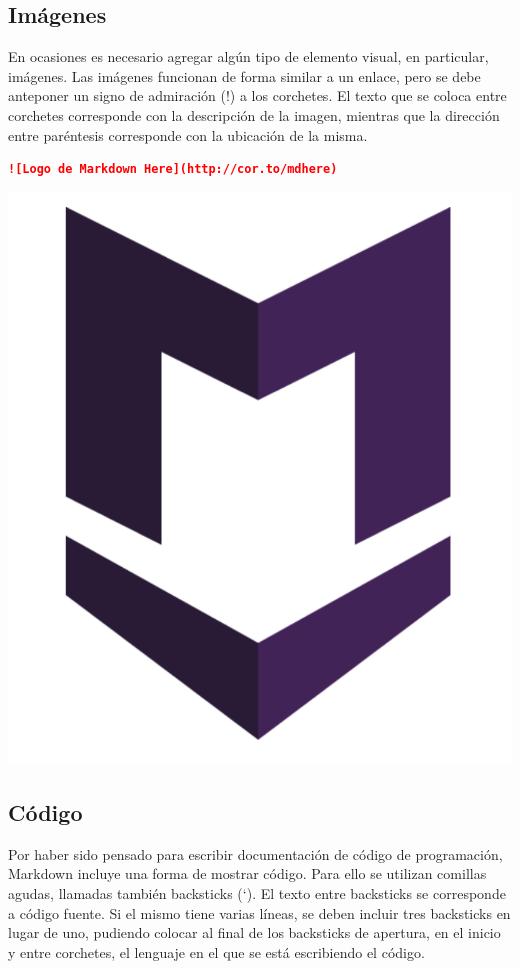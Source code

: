 \subsection*{Imágenes}

En ocasiones es necesario agregar algún tipo de elemento visual, en particular,
imágenes. Las imágenes funcionan de forma similar a un enlace, pero se debe
anteponer un signo de admiración (!) a los corchetes. El texto que se coloca
entre corchetes corresponde con la descripción de la imagen, mientras que la
dirección entre paréntesis corresponde con la ubicación de la misma.

\begin{lstlisting}[language=Markdown]
![Logo de Markdown Here](http://cor.to/mdhere)
\end{lstlisting}

\includegraphics[scale=0.4]{anexos/1_lenguajes_marcado/1_markdown/imagenes/md_imagen.png}

\subsection*{Código}

Por haber sido pensado para escribir documentación de código de programación,
Markdown incluye una forma de mostrar código. Para ello se utilizan comillas
agudas, llamadas también backsticks (`). El texto entre backsticks se corresponde
a código fuente. Si el mismo tiene varias líneas, se deben incluir tres backsticks
en lugar de uno, pudiendo colocar al final de los backsticks de apertura,
en el inicio y entre corchetes, el lenguaje en el que se está escribiendo el código.

